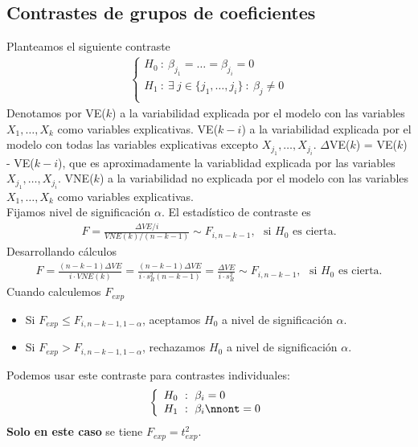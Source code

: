 \subsection{Contrastes de grupos de coeficientes}
\noindent Planteamos el siguiente contraste
\begin{align*}
    \left\{ \begin{array}{lcc}
             H_0 \ : \ \beta_{j_1} = \ldots = \beta_{j_i} = 0\\
             H_1 \ : \ \exists \ j \in \{j_1,\ldots,j_i\} \ : \ \beta_j \not = 0 \\
             \end{array}
   \right.
\end{align*}
Denotamos por VE($k$) a la variabilidad explicada por el modelo con las variables $X_{1},\ldots,X_{k}$ como variables explicativas. VE($k-i$) a la variabilidad explicada por el modelo con todas las variables explicativas excepto $X_{j_1},\ldots,X_{j_i}$. $\Delta$VE($k$) = VE($k$) - VE($k-i$), que es aproximadamente la variablidad explicada por las variables $X_{j_1},\ldots,X_{j_i}$. VNE($k$) a la variabilidad no explicada por el modelo con las variables $X_{1},\ldots,X_{k}$ como variables explicativas.
\\
\newline
Fijamos nivel de significación $\alpha$. El estadístico de contraste es
\begin{align*}
    F = \frac{\Delta VE / i}{VNE(k)/(n-k-1)} \sim F_{i,n-k-1}, \ \ \ \text{si $H_0$ es cierta}.
\end{align*}
Desarrollando cálculos
\begin{align*}
    F = \frac{(n-k-1)\Delta VE}{i \cdot VNE(k)} = \frac{(n-k-1)\Delta VE}{i \cdot s_R^2(n-k-1)} = \frac{\Delta VE}{i \cdot s_R^2} \sim F_{i,n-k-1}, \ \ \ \text{si $H_0$ es cierta}.
\end{align*}
Cuando calculemos $F_{exp}$
\begin{itemize}
    \item Si $F_{exp} \leq F_{i,n-k-1,1-\alpha}$, aceptamos $H_0$ a nivel de significación $\alpha$.
    \item Si $F_{exp} > F_{i,n-k-1,1-\alpha}$, rechazamos $H_0$ a nivel de significación $\alpha$.
\end{itemize}

\begin{obs}
    Podemos usar este contraste para contrastes individuales:
    \begin{align*}
    \left\{ \begin{array}{lcc}
             H_0 \ : \ \beta_{i} = 0\\
             H_1 \ : \ \beta_i \nnont = 0
             \end{array}
   \right.
\end{align*}
\textbf{Solo en este caso} se tiene $F_{exp} = t_{exp}^2$.
\end{obs}

